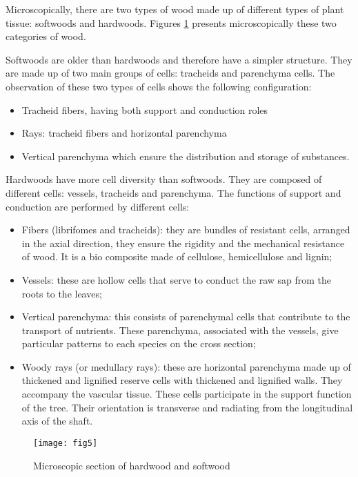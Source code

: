Microscopically, there are two types of wood made up of different types of plant tissue: softwoods and hardwoods. Figures \ref{fig:fig5} presents microscopically these two categories of wood.

Softwoods are older than hardwoods and therefore have a simpler structure. They are made up of two main groups of cells: tracheids and parenchyma cells. The observation of these two types of cells shows the following configuration:

\begin{itemize}
	\item Tracheid fibers, having both support and conduction roles
	\item Rays: tracheid fibers and horizontal parenchyma
	\item Vertical parenchyma which ensure the distribution and storage of substances.
\end{itemize}

Hardwoods have more cell diversity than softwoods. They are composed of different cells: vessels, tracheids and parenchyma. The functions of support and conduction are performed by different cells:

\begin{itemize}
	\item Fibers (librifomes and tracheids): they are bundles of resistant cells, arranged in the axial direction, they ensure the rigidity and the mechanical resistance of wood. It is a bio composite made of cellulose, hemicellulose and lignin;
	\item Vessels: these are hollow cells that serve to conduct the raw sap from the roots to the leaves;
	\item Vertical parenchyma: this consists of parenchymal cells that contribute to the transport of nutrients. These parenchyma, associated with the vessels, give particular patterns to each species on the cross section;
	\item Woody rays (or medullary rays): these are horizontal parenchyma made up of thickened and lignified reserve cells with thickened and lignified walls. They accompany the vascular tissue. These cells participate in the support function of the tree. Their orientation is transverse and radiating from the longitudinal axis of the shaft.
\end{itemize}

\graphicspath{{Images/}}
\begin{figure}[htp]
	\centering
	\texttt{[image: fig5]}
	\caption{Microscopic section of hardwood and softwood \cite{Reference1}}
	\label{fig:fig5}
\end{figure}

